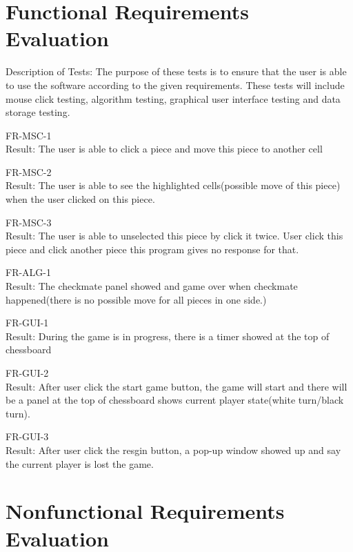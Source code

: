 \documentclass[12pt, titlepage]{article}
\begin{document}
\section{Functional Requirements Evaluation}
Description of Tests: The purpose of these tests is to ensure that the user is able to use the software according to the given requirements. These tests will include mouse click testing, algorithm testing, graphical user interface testing and data storage testing.
\item{FR-MSC-1\\}
Result: The user is able to click a piece and move this piece to another cell\\			
\item{FR-MSC-2\\}
Result: The user is able to see the highlighted cells(possible move of this piece) when the user clicked on this piece.\\	
\item{FR-MSC-3\\}
Result: The user is able to unselected this piece by click it twice. User click this piece and click another piece this program gives no response for that. \\	
\item{FR-ALG-1\\}
Result: The checkmate panel showed and game over when checkmate happened(there is no possible move for all pieces in one side.)\\
\item{FR-GUI-1\\}
Result: During the game is in progress, there is a timer showed at the top of chessboard \\	
\item{FR-GUI-2\\}
Result: After user click the start game button, the game will start and there will be a panel at the top of chessboard shows current player state(white turn/black turn).\\	
\item{FR-GUI-3\\}
Result: After user click the resgin button, a pop-up window showed up and say the current player is lost the game.\\	

\section{Nonfunctional Requirements Evaluation}
\end{document}
